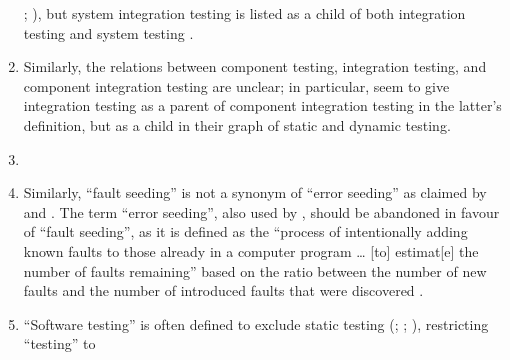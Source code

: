 \begin{enumerate}
          \citeyear[p.~41\==44, 46, 51, 58, 74]{IEEE2021b}; \citeyear[p.~6]{IEEE2021c}),
          but system integration testing is listed as a child of both
          integration testing \citepISTQB{} and system testing
          \citep[p.~23]{Firesmith2015}.
    \item %
          Similarly, the relations between component testing, integration
          testing, and component integration testing are unclear; in particular,
          \citetISTQB{} seem to give integration testing as a parent of component
          integration testing in the latter's definition, but as a child in
          their graph of static and dynamic testing.
    \item %
          \errorGuessFlaw{}
    \item %
          Similarly, ``fault seeding'' is not a synonym of ``error seeding''
          as claimed by \citet[p.~165]{IEEE2017} and
          \citet[p.~427]{vanVliet2000}. The term ``error seeding'', also
          used by \citet[p.~34]{Firesmith2015},
          should be abandoned in favour of ``fault seeding'', as it is defined
          as the ``process of intentionally adding known faults to those
          already in a computer program \dots{} [to] estimat[e] the number of
          faults remaining'' \citep[p.~165]{IEEE2017} based on the ratio
          between the number of new faults and the number of introduced faults
          that were discovered \citep[p.~427]{vanVliet2000}.
    \item %
          ``Software testing'' is often defined to exclude static testing
          (\citealp[p.~13]{Firesmith2015}; \citealp[p.~222]{AmmannAndOffutt2017};
          \citealp[p.~439]{PetersAndPedrycz2000}), restricting ``testing'' to

\end{enumerate}
